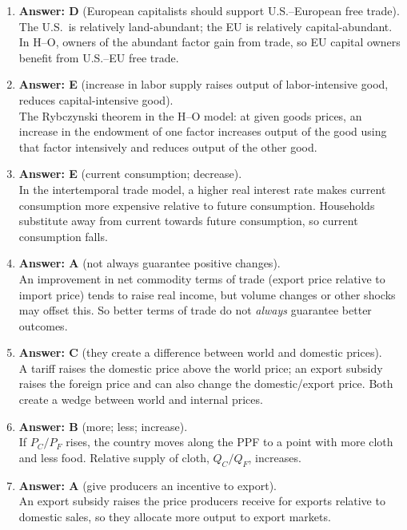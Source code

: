 \documentclass[12pt]{article}
\begin{document}
\begin{enumerate}[label=\textbf{\arabic*.}]
\item \textbf{Answer: D} (European capitalists should support U.S.–European free trade).\\
The U.S.\ is relatively land-abundant; the EU is relatively capital-abundant. In H–O, owners of the abundant factor gain from trade, so EU capital owners benefit from U.S.–EU free trade.

\item \textbf{Answer: E} (increase in labor supply raises output of labor-intensive good, reduces capital-intensive good).\\
The Rybczynski theorem in the H–O model: at given goods prices, an increase in the endowment of one factor increases output of the good using that factor intensively and reduces output of the other good.

\item \textbf{Answer: E} (current consumption; decrease).\\
In the intertemporal trade model, a higher real interest rate makes current consumption more expensive relative to future consumption. Households substitute away from current towards future consumption, so current consumption falls.

\item \textbf{Answer: A} (not always guarantee positive changes).\\
An improvement in net commodity terms of trade (export price relative to import price) tends to raise real income, but volume changes or other shocks may offset this. So better terms of trade do not \emph{always} guarantee better outcomes.

\item \textbf{Answer: C} (they create a difference between world and domestic prices).\\
A tariff raises the domestic price above the world price; an export subsidy raises the foreign price and can also change the domestic/export price. Both create a wedge between world and internal prices.

\item \textbf{Answer: B} (more; less; increase).\\
If $P_C/P_F$ rises, the country moves along the PPF to a point with more cloth and less food. Relative supply of cloth, $Q_C/Q_F$, increases.

\item \textbf{Answer: A} (give producers an incentive to export).\\
An export subsidy raises the price producers receive for exports relative to domestic sales, so they allocate more output to export markets.


\end{enumerate}
\end{document}
